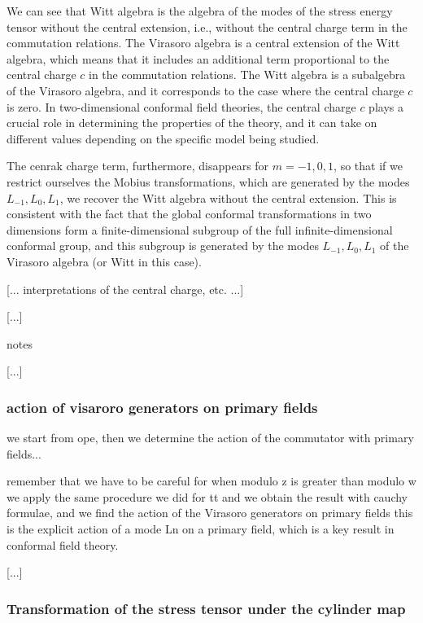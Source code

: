 We can see that Witt algebra is the algebra of the modes of the stress energy tensor without the central extension, i.e., without the central charge term in the commutation relations. The Virasoro algebra is a central extension of the Witt algebra, which means that it includes an additional term proportional to the central charge \(c\) in the commutation relations. The Witt algebra is a subalgebra of the Virasoro algebra, and it corresponds to the case where the central charge \(c\) is zero. In two-dimensional conformal field theories, the central charge \(c\) plays a crucial role in determining the properties of the theory, and it can take on different values depending on the specific model being studied.

The cenrak charge term, furthermore, disappears for \(m=-1,0,1\), so that if we restrict ourselves the Mobius transformations, which are generated by the modes \(L_{-1}, L_0, L_1\), we recover the Witt algebra without the central extension. This is consistent with the fact that the global conformal transformations in two dimensions form a finite-dimensional subgroup of the full infinite-dimensional conformal group, and this subgroup is generated by the modes \(L_{-1}, L_0, L_1\) of the Virasoro algebra (or Witt in this case).

    [... interpretations of the central charge, etc. ...]




    [...]

notes

    [...]

\subsubsection{action of visaroro generators on primary fields}

we start from ope, then we determine the action of the commutator with primary fields...

remember that we have to be careful for when modulo z is greater than modulo w
we apply the same procedure we did for tt and we obtain the result with cauchy formulae, and we find the action of the Virasoro generators on primary fields
this is the explicit action of a mode Ln on a primary field, which is a key result in conformal field theory.

    [...]

\subsubsection{Transformation of the stress tensor under the cylinder map}

